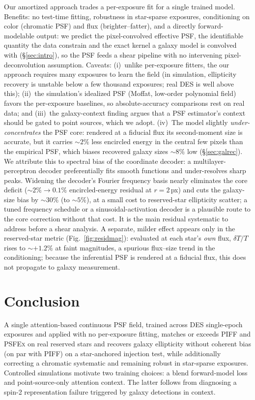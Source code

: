 \documentclass[twocolumn]{aastex701}
\begin{document}
Our amortized approach trades a per-exposure fit for a single trained model. Benefits: no
test-time fitting, robustness in star-sparse exposures, conditioning on color
(chromatic PSF) and flux (brighter--fatter), and a directly forward-modelable output: we
predict the pixel-convolved effective PSF, the identifiable quantity the data constrain
and the exact kernel a galaxy model is convolved with (\S\ref{sec:intro}), so the PSF
feeds a shear pipeline with no intervening pixel-deconvolution assumption. Caveats: (i)~unlike per-exposure fitters, the
our approach requires many exposures to learn the field (in simulation, ellipticity
recovery is unstable below a few thousand exposures; real DES is well above this);
(ii)~the simulation's idealized PSF (Moffat, low-order polynomial field) favors the
per-exposure baselines, so absolute-accuracy comparisons rest on real data; and
(iii)~the galaxy-context finding argues that a PSF estimator's context should be gated to
point sources, which we adopt. (iv)~The model slightly \emph{under-concentrates} the PSF
core: rendered at a fiducial flux its second-moment size is accurate, but it carries
${\sim}2\%$ less encircled energy in the central few pixels than the empirical PSF, which
biases recovered galaxy sizes ${\sim}8\%$ low (\S\ref{sec:galrec}). We attribute this to
spectral bias of the coordinate decoder: a multilayer-perceptron decoder preferentially fits smooth
functions and under-resolves sharp peaks. Widening the decoder's Fourier frequency basis
nearly eliminates the core deficit (${\sim}2\%\to0.1\%$ encircled-energy residual at
$r{=}2$\,px) and cuts the galaxy-size bias by ${\sim}30\%$ (to ${\sim}5\%$), at a small cost
to reserved-star ellipticity scatter; a tuned frequency schedule or a sinusoidal-activation
decoder is a plausible route to the core correction without that cost. It is the main residual systematic to address before a shear analysis. A separate, milder effect appears only in the
reserved-star metric (Fig.~\ref{fig:residmag}): evaluated at each star's \emph{own} flux,
$\delta T/T$ rises to ${\sim}{+}1.2\%$ at faint magnitudes, a spurious flux--size trend in
the conditioning; because the inferential PSF is rendered at a fiducial flux, this does not
propagate to galaxy measurement.

\section{Conclusion} \label{sec:conclusion}

A single attention-based continuous PSF field, trained across DES single-epoch exposures
and applied with no per-exposure fitting, matches or exceeds \textsc{PIFF} and
\textsc{PSFEx} on real reserved stars and recovers galaxy ellipticity without coherent
bias (on par with \textsc{PIFF}) on a star-anchored injection test, while additionally
correcting a chromatic systematic and remaining robust in star-sparse exposures. Controlled simulations motivate
two training choices: a blend forward-model loss and point-source-only attention
context. The latter follows from diagnosing a spin-2 representation failure triggered
by galaxy detections in context.
\end{document}
